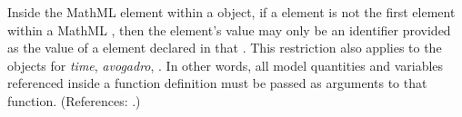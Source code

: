 Inside the  MathML element within a \FunctionDefinition
object, if a  element is not the first element within a MathML
, then the  element's value may only be an
identifier provided as the value of a  element declared in that
.  This restriction also applies to the 
objects for \emph{time}, \emph{avogadro}, .  In other words, all model
quantities and variables referenced inside a function definition must be
passed as arguments to that function.  (References: .)
